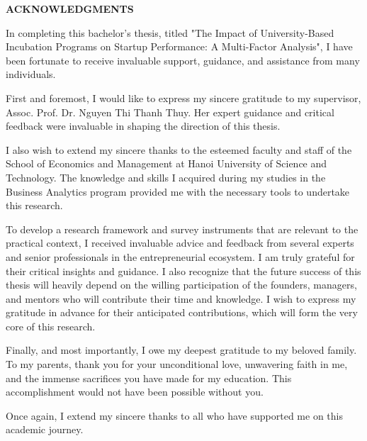 \documentclass[../Main.tex]{subfiles}
\begin{document}
	\begin{center}
		\Large{\textbf{ACKNOWLEDGMENTS}}\\
	\end{center}
	\vspace{1cm}
	In completing this bachelor's thesis, titled "The Impact of University-Based Incubation Programs on Startup Performance: A Multi-Factor Analysis", I have been fortunate to receive invaluable support, guidance, and assistance from many individuals.

	First and foremost, I would like to express my sincere gratitude to my supervisor, Assoc. Prof. Dr. Nguyen Thi Thanh Thuy. Her expert guidance and critical feedback were invaluable in shaping the direction of this thesis.

	I also wish to extend my sincere thanks to the esteemed faculty and staff of the School of Economics and Management at Hanoi University of Science and Technology. The knowledge and skills I acquired during my studies in the Business Analytics program provided me with the necessary tools to undertake this research.

	To develop a research framework and survey instruments that are relevant to the practical context, I received invaluable advice and feedback from several experts and senior professionals in the entrepreneurial ecosystem. I am truly grateful for their critical insights and guidance. I also recognize that the future success of this thesis will heavily depend on the willing participation of the founders, managers, and mentors who will contribute their time and knowledge. I wish to express my gratitude in advance for their anticipated contributions, which will form the very core of this research.

	Finally, and most importantly, I owe my deepest gratitude to my beloved family. To my parents, thank you for your unconditional love, unwavering faith in me, and the immense sacrifices you have made for my education. This accomplishment would not have been possible without you.

	Once again, I extend my sincere thanks to all who have supported me on this academic journey.
\end{document}
